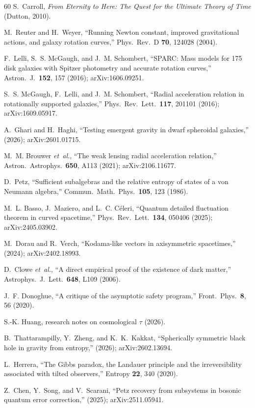 \documentclass[prl,twocolumn,superscriptaddress,longbibliography,floatfix]{revtex4-2}
\newcommand{\tauasym}{\tau}
\begin{document}
\begin{thebibliography}{60}
S.~Carroll,
\emph{From Eternity to Here: The Quest for the Ultimate Theory
of Time}
(Dutton, 2010).

M.~Reuter and H.~Weyer,
``Running Newton constant, improved gravitational actions, and
galaxy rotation curves,''
Phys.\ Rev.\ D \textbf{70}, 124028 (2004).

F.~Lelli, S.~S. McGaugh, and J.~M. Schombert,
``SPARC: Mass models for 175 disk galaxies with Spitzer
photometry and accurate rotation curves,''
Astron.\ J.\ \textbf{152}, 157 (2016); arXiv:1606.09251.

S.~S. McGaugh, F.~Lelli, and J.~M. Schombert,
``Radial acceleration relation in rotationally supported
galaxies,''
Phys.\ Rev.\ Lett.\ \textbf{117}, 201101 (2016);
arXiv:1609.05917.

A.~Ghari and H.~Haghi,
``Testing emergent gravity in dwarf spheroidal galaxies,''
(2026); arXiv:2601.01715.

M.~M. Brouwer \emph{et~al.},
``The weak lensing radial acceleration relation,''
Astron.\ Astrophys.\ \textbf{650}, A113 (2021);
arXiv:2106.11677.

D.~Petz,
``Sufficient subalgebras and the relative entropy of states of a
von Neumann algebra,''
Commun.\ Math.\ Phys.\ \textbf{105}, 123 (1986).

M.~L. Basso, J.~Maziero, and L.~C. C\'{e}leri,
``Quantum detailed fluctuation theorem in curved spacetime,''
Phys.\ Rev.\ Lett.\ \textbf{134}, 050406 (2025);
arXiv:2405.03902.

M.~Dorau and R.~Verch,
``Kodama-like vectors in axisymmetric spacetimes,''
(2024); arXiv:2402.18993.

D.~Clowe \emph{et~al.},
``A direct empirical proof of the existence of dark matter,''
Astrophys.\ J.\ Lett.\ \textbf{648}, L109 (2006).

J.~F. Donoghue,
``A critique of the asymptotic safety program,''
Front.\ Phys.\ \textbf{8}, 56 (2020).

S.-K. Huang,
research notes on cosmological $\tauasym$ (2026).

B.~Thattarampilly, Y.~Zheng, and K.~K.~Kakkat,
``Spherically symmetric black hole in gravity from entropy,''
(2026); arXiv:2602.13694.

L.~Herrera,
``The Gibbs paradox, the Landauer principle and the irreversibility
associated with tilted observers,''
Entropy \textbf{22}, 340 (2020).

Z.~Chen, Y.~Song, and V.~Scarani,
``Petz recovery from subsystems in bosonic quantum error correction,''
(2025); arXiv:2511.05941.

\end{thebibliography}
\end{document}
